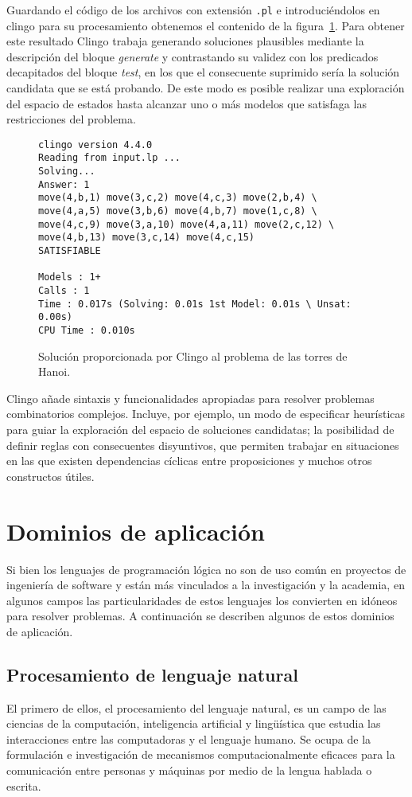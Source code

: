 \documentclass[11pt,captions=nooneline,DIV=14, parskip=full]{scrartcl}
\begin{document}
Guardando el código de los archivos con extensión \texttt{.pl} e introduciéndolos en clingo para su procesamiento obtenemos el contenido de la figura~\ref{fig:clingosol}. Para obtener este resultado Clingo trabaja generando soluciones plausibles mediante la descripción del bloque \textit{generate} y contrastando su validez con los predicados decapitados del bloque \textit{test}, en los que el consecuente suprimido sería la solución candidata que se está probando. De este modo es posible realizar una exploración del espacio de estados hasta alcanzar uno o más modelos que satisfaga las restricciones del problema.

\begin{figure}[!htbp]
\begin{lstlisting}[frame=single]
clingo version 4.4.0
Reading from input.lp ...
Solving...
Answer: 1
move(4,b,1) move(3,c,2) move(4,c,3) move(2,b,4) \
move(4,a,5) move(3,b,6) move(4,b,7) move(1,c,8) \
move(4,c,9) move(3,a,10) move(4,a,11) move(2,c,12) \
move(4,b,13) move(3,c,14) move(4,c,15)
SATISFIABLE

Models : 1+
Calls : 1
Time : 0.017s (Solving: 0.01s 1st Model: 0.01s \ Unsat: 0.00s)
CPU Time : 0.010s
\end{lstlisting} 
\caption{Solución proporcionada por Clingo al problema de las torres de Hanoi.}
\label{fig:clingosol}
\end{figure}

Clingo añade sintaxis y funcionalidades apropiadas para resolver problemas combinatorios complejos. Incluye, por ejemplo, un modo de especificar heurísticas para guiar la exploración del espacio de soluciones candidatas; la posibilidad de definir reglas con consecuentes disyuntivos, que permiten trabajar en situaciones en las que existen dependencias cíclicas entre proposiciones y muchos otros constructos útiles.

\section{Dominios de aplicación}
\label{sec:dominios}
Si bien los lenguajes de programación lógica no son de uso común en proyectos de ingeniería de software y están más vinculados a la investigación y la academia, en algunos campos las particularidades de estos lenguajes los convierten en idóneos para resolver problemas. A continuación se describen algunos de estos dominios de aplicación.

\subsection{Procesamiento de lenguaje natural}
El primero de ellos, el procesamiento del lenguaje natural, es un campo de las ciencias de la computación, inteligencia artificial y lingüística que estudia las interacciones entre las computadoras y el lenguaje humano. Se ocupa de la formulación e investigación de mecanismos computacionalmente eficaces para la comunicación entre personas y máquinas por medio de la lengua hablada o escrita.
\end{document}
